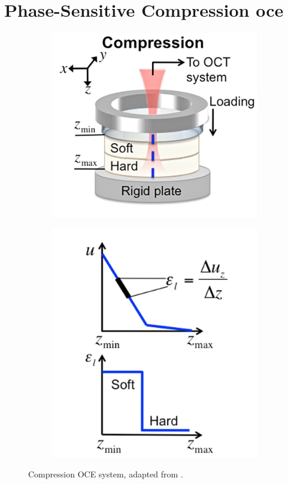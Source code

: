 \section{Phase-Sensitive Compression \ac{oce}}\label{compression_oce}    
\begin{figure}
	\centering
	\begin{subfigure}{0.4\textwidth}
    		\centering
        	\includegraphics[width=\textwidth]{bground_figs/oce_hardware.png}
    	\end{subfigure}
   	\begin{subfigure}{0.3\textwidth}
    		\centering
	        \includegraphics[width=\textwidth]{bground_figs/ascan_example.png}
	\end{subfigure}
	\caption{Compression OCE system, adapted from \cite{kennedy_review_2014}.}
	\label{oce_system}
\end{figure}

